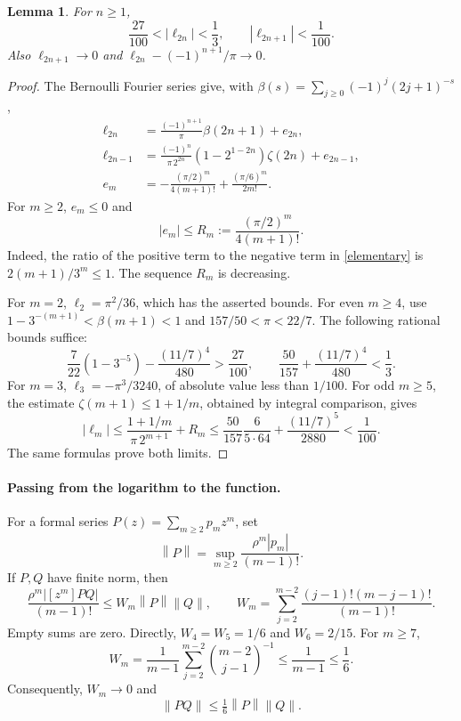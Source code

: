 \documentclass[11pt]{article}
\newtheorem{lemma}{Lemma}
\newcommand{\norm}[1]{\left\lVert #1\right\rVert}
\begin{document}
\begin{lemma}\label{logbounds}
For \(n\ge1\),
\[
 \frac{27}{100}<|\ell_{2n}|<\frac13,\qquad
 |\ell_{2n+1}|<\frac1{100}.
\]
Also \(\ell_{2n+1}\to0\) and
\(\ell_{2n}-(-1)^{n+1}/\pi\to0\).
\end{lemma}
\begin{proof}
The Bernoulli Fourier series \cite[Eqs.~24.8.1--24.8.2]{DLMF}
give, with \(\beta(s)=\sum_{j\ge0}(-1)^j(2j+1)^{-s}\),
\begin{align}
 \ell_{2n}&=\frac{(-1)^{n+1}}{\pi}\beta(2n+1)+e_{2n},
 \label{evenfourier}\\
 \ell_{2n-1}&=\frac{(-1)^n}{\pi\,2^{2n}}
       (1-2^{1-2n})\zeta(2n)+e_{2n-1},\label{oddfourier}\\
 e_m&=-\frac{(\pi/2)^m}{4(m+1)!}
             +\frac{(\pi/6)^m}{2m!}.\label{elementary}
\end{align}
For \(m\ge2\), \(e_m\le0\) and
\[
 |e_m|\le R_m:=\frac{(\pi/2)^m}{4(m+1)!}.
\]
Indeed, the ratio of the positive term to the negative term in
\eqref{elementary} is \(2(m+1)/3^m\le1\).
The sequence \(R_m\) is decreasing.

For \(m=2\), \(\ell_2=\pi^2/36\), which has the asserted bounds.
For even \(m\ge4\), use \(1-3^{-(m+1)}<\beta(m+1)<1\)
and \(157/50<\pi<22/7\). The following rational bounds suffice:
\[
 \frac7{22}(1-3^{-5})-\frac{(11/7)^4}{480}>
 \frac{27}{100},\qquad
 \frac{50}{157}+\frac{(11/7)^4}{480}<\frac13.
\]
For \(m=3\), \(\ell_3=-\pi^3/3240\), of absolute value less than
\(1/100\). For odd \(m\ge5\), the estimate
\(\zeta(m+1)\le1+1/m\), obtained by integral comparison, gives
\[
 |\ell_m|\le
 \frac{1+1/m}{\pi\,2^{m+1}}+R_m
 \le\frac{50}{157}\frac6{5\cdot64}
        +\frac{(11/7)^5}{2880}<\frac1{100}.
\]
The same formulas prove both limits.
\end{proof}

\paragraph{Passing from the logarithm to the function.}
For a formal series \(P(z)=\sum_{m\ge2}p_mz^m\), set
\[
 \norm{P}=\sup_{m\ge2}\frac{\rho^m|p_m|}{(m-1)!}.
\]
If \(P,Q\) have finite norm, then
\begin{equation}\label{product}
 \frac{\rho^m|[z^m]PQ|}{(m-1)!}
 \le W_m\norm{P}\norm{Q},
 \qquad
 W_m=\sum_{j=2}^{m-2}\frac{(j-1)!(m-j-1)!}{(m-1)!}.
\end{equation}
Empty sums are zero. Directly,
\(W_4=W_5=1/6\) and \(W_6=2/15\).
For \(m\ge7\),
\[
 W_m=\frac1{m-1}\sum_{j=2}^{m-2}
          \binom{m-2}{j-1}^{-1}\le\frac1{m-1}\le\frac16.
\]
Consequently, \(W_m\to0\) and
\begin{equation}\label{normproduct}
 \norm{PQ}\le\tfrac16\norm{P}\norm{Q}.
\end{equation}
\end{document}
